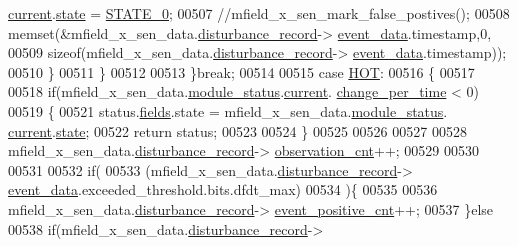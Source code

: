 \begin{DoxyCode}
      \hyperlink{a00019_acf41ffc11da291c2f9f0fcb02ee72b98}{current}.\hyperlink{a00019_a6b8d8e916bc56265a3fd279bd26b6d1b}{state} = \hyperlink{a00021_ad6739dbbe5581cac99b7dc8a5e09949c}{STATE\_0};
00507                              \textcolor{comment}{//mfield\_x\_sen\_mark\_false\_postives();}
00508                              memset(&mfield\_x\_sen\_data.\hyperlink{a00025_ac9b38e2c1d3f1013a88d33506c754152}{disturbance\_record}->
      \hyperlink{a00028_a8c0bda69e71ef674e60da47ad0be9ab0}{event\_data}.timestamp,0,
00509                              \textcolor{keyword}{sizeof}(mfield\_x\_sen\_data.\hyperlink{a00025_ac9b38e2c1d3f1013a88d33506c754152}{disturbance\_record}->
      \hyperlink{a00028_a8c0bda69e71ef674e60da47ad0be9ab0}{event\_data}.timestamp));
00510                        \}
00511              \}
00512 
00513         \}\textcolor{keywordflow}{break};
00514 
00515         \textcolor{keywordflow}{case} \hyperlink{a00021_a1eb14cc432874ddacd1934791dbe12a3}{HOT}:
00516         \{
00517 
00518             \textcolor{keywordflow}{if}(mfield\_x\_sen\_data.\hyperlink{a00025_adfab5a5d8b45a93dfb13edb24e2b80e3}{module\_status}.\hyperlink{a00019_acf41ffc11da291c2f9f0fcb02ee72b98}{current}.
      \hyperlink{a00019_a0f645dd76b41adc6a966feba8e4bff8c}{change\_per\_time} < 0)
00519             \{
00521                status.\hyperlink{a00021_a5296d090c085b0421fdf5a86e382abea}{fields}.state = mfield\_x\_sen\_data.\hyperlink{a00025_adfab5a5d8b45a93dfb13edb24e2b80e3}{module\_status}.
      \hyperlink{a00019_acf41ffc11da291c2f9f0fcb02ee72b98}{current}.\hyperlink{a00019_a6b8d8e916bc56265a3fd279bd26b6d1b}{state};
00522                \textcolor{keywordflow}{return} status;
00523 
00524             \}
00525 
00526 
00527 
00528              mfield\_x\_sen\_data.\hyperlink{a00025_ac9b38e2c1d3f1013a88d33506c754152}{disturbance\_record}->
      \hyperlink{a00028_ad5b0bac02ce266b91b2b52a1c3ea1d78}{observation\_cnt}++;
00529 
00530 
00531 
00532             \textcolor{keywordflow}{if}(
00533               (mfield\_x\_sen\_data.\hyperlink{a00025_ac9b38e2c1d3f1013a88d33506c754152}{disturbance\_record}->
      \hyperlink{a00028_a8c0bda69e71ef674e60da47ad0be9ab0}{event\_data}.exceeded\_threshold.bits.dfdt\_max)
00534               )\{
00535 
00536                  mfield\_x\_sen\_data.\hyperlink{a00025_ac9b38e2c1d3f1013a88d33506c754152}{disturbance\_record}->
      \hyperlink{a00028_a7397b9d76d4b57500f27bb23d258a18a}{event\_positive\_cnt}++;
00537             \}\textcolor{keywordflow}{else}
00538             \textcolor{keywordflow}{if}(mfield\_x\_sen\_data.\hyperlink{a00025_ac9b38e2c1d3f1013a88d33506c754152}{disturbance\_record}->

\end{DoxyCode}
